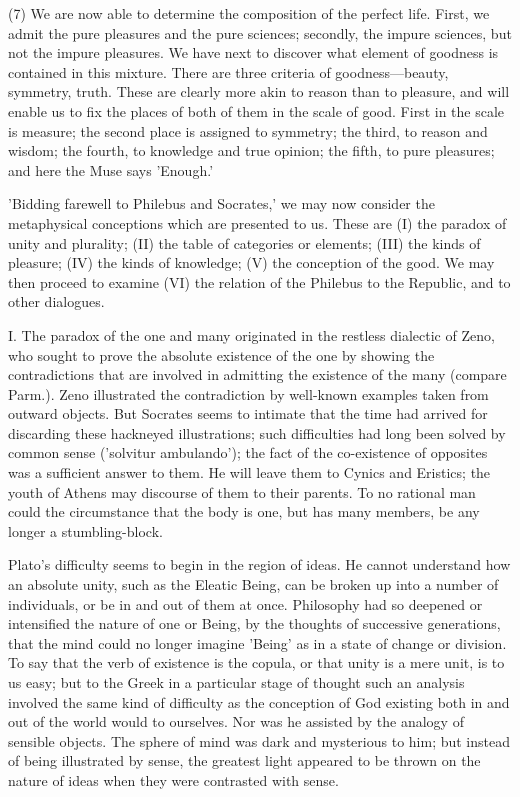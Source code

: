 \documentclass[11pt,letter]{article}
\begin{document}
\par  (7) We are now able to determine the composition of the perfect life. First, we admit the pure pleasures and the pure sciences; secondly, the impure sciences, but not the impure pleasures. We have next to discover what element of goodness is contained in this mixture. There are three criteria of goodness—beauty, symmetry, truth. These are clearly more akin to reason than to pleasure, and will enable us to fix the places of both of them in the scale of good. First in the scale is measure; the second place is assigned to symmetry; the third, to reason and wisdom; the fourth, to knowledge and true opinion; the fifth, to pure pleasures; and here the Muse says 'Enough.'

\par  'Bidding farewell to Philebus and Socrates,' we may now consider the metaphysical conceptions which are presented to us. These are (I) the paradox of unity and plurality; (II) the table of categories or elements; (III) the kinds of pleasure; (IV) the kinds of knowledge; (V) the conception of the good. We may then proceed to examine (VI) the relation of the Philebus to the Republic, and to other dialogues.

\par  I. The paradox of the one and many originated in the restless dialectic of Zeno, who sought to prove the absolute existence of the one by showing the contradictions that are involved in admitting the existence of the many (compare Parm.). Zeno illustrated the contradiction by well-known examples taken from outward objects. But Socrates seems to intimate that the time had arrived for discarding these hackneyed illustrations; such difficulties had long been solved by common sense ('solvitur ambulando'); the fact of the co-existence of opposites was a sufficient answer to them. He will leave them to Cynics and Eristics; the youth of Athens may discourse of them to their parents. To no rational man could the circumstance that the body is one, but has many members, be any longer a stumbling-block.

\par  Plato's difficulty seems to begin in the region of ideas. He cannot understand how an absolute unity, such as the Eleatic Being, can be broken up into a number of individuals, or be in and out of them at once. Philosophy had so deepened or intensified the nature of one or Being, by the thoughts of successive generations, that the mind could no longer imagine 'Being' as in a state of change or division. To say that the verb of existence is the copula, or that unity is a mere unit, is to us easy; but to the Greek in a particular stage of thought such an analysis involved the same kind of difficulty as the conception of God existing both in and out of the world would to ourselves. Nor was he assisted by the analogy of sensible objects. The sphere of mind was dark and mysterious to him; but instead of being illustrated by sense, the greatest light appeared to be thrown on the nature of ideas when they were contrasted with sense.
\end{document}

